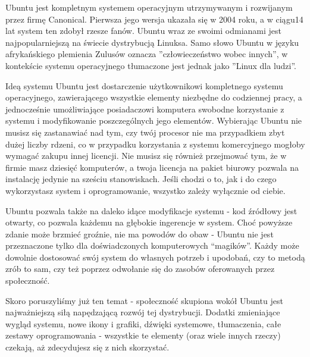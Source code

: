 Ubuntu jest kompletnym systemem operacyjnym utrzymywanym i rozwijanym przez firmę Canonical. Pierwsza jego wersja ukazała się w 2004 roku, a w ciągu14 lat system ten zdobył rzesze fanów. Ubuntu wraz ze swoimi odmianami jest najpopularniejszą na świecie dystrybucją Linuksa. Samo słowo Ubuntu w języku afrykańskiego plemienia Zulusów oznacza ”człowieczeństwo wobec innych”, w kontekście systemu operacyjnego tłumaczone jest jednak jako ”Linux dla ludzi”.

Ideą systemu Ubuntu jest dostarczenie użytkownikowi kompletnego systemu operacyjnego, zawierającego wszystkie elementy niezbędne do codziennej pracy, a jednocześnie umożliwiające posiadaczowi komputera swobodne korzystanie z systemu i modyfikowanie poszczególnych jego elementów. Wybierając Ubuntu nie musisz się zastanawiać nad tym, czy twój procesor nie ma przypadkiem zbyt dużej liczby rdzeni, co w przypadku korzystania z systemu komercyjnego mogłoby wymagać zakupu innej licencji. Nie musisz się również przejmować tym, że w firmie masz dziesięć komputerów, a twoja licencja na pakiet biurowy pozwala na instalację jedynie na sześciu stanowiskach. Jeśli chodzi o to, jak i do czego wykorzystasz system i oprogramowanie, wszystko zależy wyłącznie od ciebie.

Ubuntu pozwala także na daleko idące modyfikacje systemu - kod źródłowy jest otwarty, co pozwala każdemu na głębokie ingerencje w system. Choć powyższe zdanie może brzmieć groźnie, nie ma powodów do obaw - Ubuntu nie jest przeznaczone tylko dla doświadczonych komputerowych “magików”. Każdy może dowolnie dostosować swój system do własnych potrzeb i upodobań, czy to metodą zrób to sam, czy też poprzez odwołanie się do zasobów oferowanych przez społeczność.

Skoro poruszyliśmy już ten temat - społeczność skupiona wokół Ubuntu jest najważniejszą siłą napędzającą rozwój tej dystrybucji. Dodatki zmieniające wygląd systemu, nowe ikony i grafiki, dźwięki systemowe, tłumaczenia, całe zestawy oprogramowania - wszystkie te elementy (oraz wiele innych rzeczy) czekają, aż zdecydujesz się z nich skorzystać.
\clearpage
